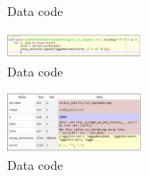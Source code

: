 \begin{enumerate}
\begin{figure}[H]
        \centering
        \caption{Data code}
    \end{figure}
    \begin{figure}[H]
        \includegraphics[width=4cm]{figures/1174096/tugas5/praktek4_6.PNG}
        \centering
        \caption{Data code}
    \end{figure}
    \begin{figure}[H]
        \includegraphics[width=4cm]{figures/1174096/tugas5/praktek4_7.PNG}
        \centering
        \caption{Data code}
    \end{figure}


\end{enumerate}
